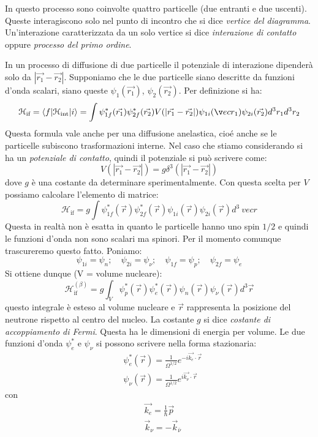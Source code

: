 In questo processo sono coinvolte quattro particelle (due entranti e due 
uscenti). Queste interagiscono solo nel punto di incontro che si dice 
\textit{vertice del diagramma}.
Un'interazione caratterizzata da un solo vertice si dice \textit{interazione di 
contatto} oppure \textit{processo del primo ordine}.

In un processo di diffusione di due particelle  il potenziale di interazione 
dipenderà solo da $|\vec{r_1}-\vec{r_2}|$. Supponiamo che le due particelle 
siano descritte da funzioni d'onda
scalari, siano queste $\psi_1(\vec{r_1})$, $\psi_2(\vec{r_2})$. Per definizione 
si ha:
\[
\mathcal{H}_{\text{if}}=\langle f|\mathcal{H}_{\text{int}}|i\rangle=\int 
\psi^*_{1f}(\vec{r_1})\psi^*_{2f}(\vec{r_2})V(|\vec{r_1}-\vec{r_2}|)\psi_{1i}(\v
ec{r_1})\psi_{2i}(\vec{r_2})d^3r_1d^3r_2
\]
Questa formula vale anche per una diffusione anelastica, cioé anche se le 
particelle subiscono trasformazioni interne. Nel caso che stiamo considerando 
si ha un \textit{potenziale di contatto},
quindi il potenziale si può scrivere come:
\[
V(|\vec{r_1}-\vec{r_2}|)=g\delta^3(|\vec{r_1}-\vec{r_2}|)
\]
dove $g$ è una costante da determinare sperimentalmente. Con questa scelta per 
$V$ possiamo calcolare l'elemento di matrice:
\[
\mathcal{H}_{\text{if}}=g\int 
\psi^*_{1f}(\vec{r})\psi^*_{2f}(\vec{r})\psi_{1i}(\vec{r})\psi_{2i}(\vec{r})d^3\
vec{r}
\]
Questa in realtà non è esatta in quanto le particelle hanno uno spin $1/2$ e 
quindi le funzioni d'onda non sono scalari ma spinori. Per il momento comunque 
trascureremo questo fatto. Poniamo:
\[
\psi_{1i}=\psi_n;\quad\psi_{2i}=\psi_{\nu};\quad\psi_{1f}=\psi_p;\quad\psi_{2f}=
\psi_e
\]
Si ottiene dunque (V = volume nucleare):
\[
\mathcal{H}_{\text{if}}^{(\beta)}=g\int_V\psi^*_p(\vec{r})\psi^*_e(\vec{r})\psi_
n(\vec{r})\psi_{\nu}(\vec{r})d^3\vec{r}
\]
questo integrale è esteso al volume nucleare e $\vec{r}$ rappresenta la 
posizione del neutrone rispetto al centro del nucleo. La costante $g$ si dice 
\textit{costante di accoppiamento di Fermi}.
Questa ha le dimensioni di energia per volume. Le due funzioni d'onda 
$\psi^*_e$ e $\psi_{\nu}$ si possono scrivere nella forma stazionaria:
\begin{align*}
&\psi_e^*(\vec{r})=\frac{1}{\Omega^{1/2}}e^{-i\vec{k_e}\cdot\vec{r}}\\
&\psi_{\nu}(\vec{r})=\frac{1}{\Omega^{1/2}}e^{i\vec{k_{\nu}}\cdot\vec{r}}
\end{align*}
con
\begin{align*}
&\vec{k_e}=\frac{1}{\hbar}\vec{p}\\
&\vec{k}_{\nu}=-\vec{k}_{\bar{\nu}}
\end{align*}
